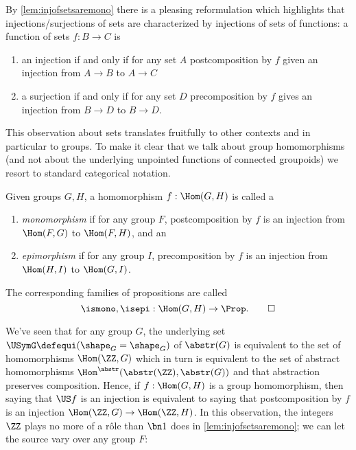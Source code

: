 By \cref{lem:injofsetsaremono} there is a pleasing reformulation which highlights that injections/surjections of sets are characterized by injections of sets of functions: a function of sets $f:B\to C$ is
\begin{enumerate}
\item  an injection if and only if for any set $A$ postcomposition by $f$ given an injection from $A\to B$ to $A\to C$
\item a surjection if and only if for any set $D$ precomposition by $f$ gives an injection from $B\to D$ to $B\to D$.
\end{enumerate}

This observation about sets translates fruitfully to other contexts and in particular to groups.  To make it clear that we talk about group homomorphisms (and not about the underlying unpointed functions of connected groupoids) we resort to standard categorical notation.
\begin{definition}\label{def:monomorphism}
Given groups $G,H$, a homomorphism $f: \Hom(G,H)$ is called a\label{def:epimorphism}
\begin{enumerate}
\item \emph{monomorphism} if for any group $F$,
  postcomposition by $f$ is an injection from $\Hom(F,G)$ to $\Hom(F,H)$, and an
\item \emph{epimorphism} if for any group $I$,
  precomposition by $f$ is an injection from $\Hom(H,I)$ to $\Hom(G,I)$.
\end{enumerate}
The corresponding families of propositions are called
\[
  \ismono,\isepi:\Hom(G,H)\to\Prop.\qedhere
\]
\end{definition}

We've seen that for any group $G$, the underlying set $\USymG\defequi(\shape_G=\shape_G)$ of $\abstr(G)$ is equivalent to the set of homomorphisms $\Hom(\ZZ,G)$ which in turn is equivalent to the set of abstract homomorphisms $\Hom^{\abstr}(\abstr(\ZZ),\abstr(G))$ and that abstraction preserves composition.
Hence, if $f:\Hom(G,H)$ is a group homomorphism, then saying that
$\US f$ is an injection is equivalent to saying that postcomposition by $f$ is an injection $\Hom(\ZZ,G)\to\Hom(\ZZ,H)$.
In this observation, the integers $\ZZ$ plays no more of a r\^ole than $\bn 1$ does in \cref{lem:injofsetsaremono}; we can let the source vary over any group $F$:


